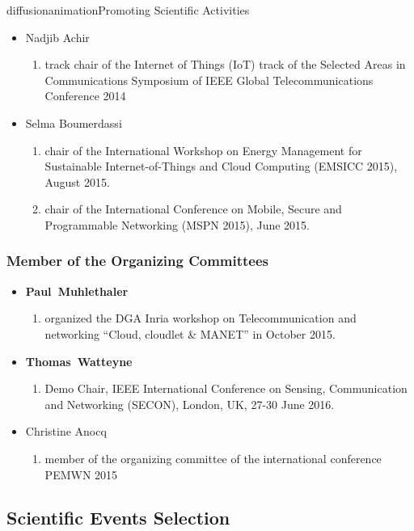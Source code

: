 \documentclass{ra2016}
\newcommand{\paul}  {\textbf{Paul~Muhlethaler}}
\newcommand{\thomas}  {\textbf{Thomas~Watteyne}}
\begin{document}
\begin{module}{diffusion}{animation}{Promoting Scientific Activities}
\begin{itemize}
\begin{enumerate}
        \end{enumerate}
    \item Nadjib Achir
        \begin{enumerate}
            \item track chair of the Internet of Things (IoT) track of the Selected Areas in Communications Symposium of IEEE Global Telecommunications Conference 2014
        \end{enumerate}
    \item Selma Boumerdassi
        \begin{enumerate}
            \item chair of the International Workshop on Energy Management for Sustainable Internet-of-Things and Cloud Computing (EMSICC 2015), August 2015.
						\item chair of the International Conference on Mobile, Secure and Programmable Networking (MSPN 2015), June 2015.
        \end{enumerate}
\end{itemize}

    
    \subsubsection{Member of the Organizing Committees}
    \begin{itemize}
    \item \paul
        \begin{enumerate}
            \item organized the DGA Inria workshop on Telecommunication and networking ``Cloud, cloudlet \& MANET'' in October 2015.
        \end{enumerate}
    \item \thomas
        \begin{enumerate}
            \item Demo Chair, IEEE International Conference on Sensing, Communication and Networking (SECON), London, UK, 27-30 June 2016.
        \end{enumerate}
    \item Christine Anocq
        \begin{enumerate}
            \item member of the organizing committee of the international conference PEMWN 2015
        \end{enumerate}
\end{itemize}

    
\subsection {Scientific Events Selection}


\end{module}
\end{document}
